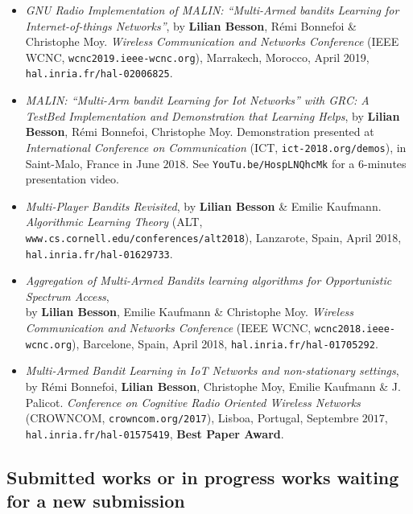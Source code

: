 \begin{itemize}
\item
    \emph{GNU Radio Implementation of MALIN: ``Multi-Armed bandits Learning for Internet-of-things Networks''},
    by \textbf{Lilian Besson}, Rémi Bonnefoi \& Christophe Moy.
    \emph{Wireless Communication and Networks Conference} (IEEE WCNC, \texttt{wcnc2019.ieee-wcnc.org}), Marrakech, Morocco, April 2019,
    \texttt{hal.inria.fr/hal-02006825}.

\item
    \emph{MALIN: ``Multi-Arm bandit Learning for Iot Networks'' with GRC: A TestBed Implementation and Demonstration that Learning Helps},
    by \textbf{Lilian Besson}, Rémi Bonnefoi, Christophe Moy.
    Demonstration presented at \emph{International Conference on Communication} (ICT, \texttt{ict-2018.org/demos}), in Saint-Malo, France in June $2018$.
    See \texttt{YouTu.be/HospLNQhcMk} for a $6$-minutes presentation video.

\item
    \emph{Multi-Player Bandits Revisited},
    by \textbf{Lilian Besson} \& Emilie Kaufmann.
    \emph{Algorithmic Learning Theory} (ALT, \texttt{www.cs.cornell.edu/conferences/alt2018}), Lanzarote, Spain, April 2018,
    \texttt{hal.inria.fr/hal-01629733}.

\item
    \emph{Aggregation of Multi-Armed Bandits learning algorithms for Opportunistic Spectrum Access},\\
    by \textbf{Lilian Besson}, Emilie Kaufmann \& Christophe Moy.
    \emph{Wireless Communication and Networks Conference} (IEEE WCNC, \texttt{wcnc2018.ieee-wcnc.org}), Barcelone, Spain, April 2018,
    \texttt{hal.inria.fr/hal-01705292}.

\item
    \emph{Multi-Armed Bandit Learning in IoT Networks and non-stationary settings},
    by Rémi Bonnefoi, \textbf{Lilian Besson}, Christophe Moy, Emilie Kaufmann \& J. Palicot.
    \emph{Conference on Cognitive Radio Oriented Wireless Networks} (CROWNCOM, \texttt{crowncom.org/2017}), Lisboa, Portugal, Septembre $2017$,
    \texttt{hal.inria.fr/hal-01575419},
    \textbf{Best Paper Award}.

\end{itemize}


\subsection{Submitted works or in progress works waiting for a new submission}

